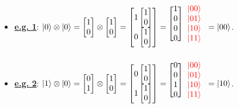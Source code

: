 \documentclass{book}
\begin{document}
\begin{itemize}
    \item \uline{\textbf{e.g. 1}}: $\ket{0} \otimes \ket{0} = \begin{bmatrix} 1 \\ 0 \end{bmatrix} \otimes \begin{bmatrix} 1 \\ 0 \end{bmatrix} = \begin{bmatrix} 1 \begin{bmatrix} 1 \\ 0 \end{bmatrix} \\ 0 \begin{bmatrix} 1 \\ 0 \end{bmatrix} \end{bmatrix} = \begin{blockarray}{cc}
        \begin{block}{[c]c}
            1 & \textcolor{red}{\ket{00}} \\
            0 & \textcolor{red}{\ket{01}} \\
            0 & \textcolor{red}{\ket{10}} \\
            0 & \textcolor{red}{\ket{11}} \\
        \end{block}
    \end{blockarray} = \ket{00}$.
    \item \uline{\textbf{e.g. 2}}: $\ket{1} \otimes \ket{0} = \begin{bmatrix} 0 \\ 1 \end{bmatrix} \otimes \begin{bmatrix} 1 \\ 0 \end{bmatrix} = \begin{bmatrix} 0 \begin{bmatrix} 1 \\ 0 \end{bmatrix} \\ 1 \begin{bmatrix} 1 \\ 0 \end{bmatrix} \end{bmatrix} = \begin{blockarray}{cc}
        \begin{block}{[c]c}
            0 & \textcolor{red}{\ket{00}} \\
            0 & \textcolor{red}{\ket{01}} \\
            1 & \textcolor{red}{\ket{10}} \\
            0 & \textcolor{red}{\ket{11}} \\
        \end{block}
    \end{blockarray} = \ket{10}$.
\end{itemize}
\end{document}
